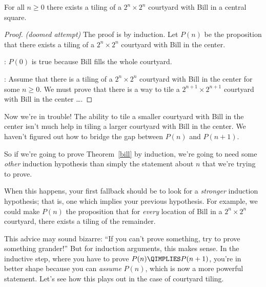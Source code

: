 \begin{theorem}\label{bill}
For all $n \geq 0$ there exists a tiling of a $2^n \times 2^n$
courtyard with Bill in a central square.
\end{theorem}

\begin{proof}
\emph{(doomed attempt)} The proof is by induction.  Let $P(n)$ be the
proposition that there exists a tiling of a $2^n \times 2^n$ courtyard
with Bill in the center.

: $P(0)$ is true because Bill fills the whole courtyard.

: Assume that there is a tiling of a
$2^n \times 2^n$ courtyard with Bill in the center for some $n \geq
0$.  We must prove that there is a way to tile a $2^{n+1} \times
2^{n+1}$ courtyard with Bill in the center \dots.
\end{proof}

Now we're in trouble!  The ability to tile a smaller courtyard with Bill
in the center isn't much help in tiling a larger courtyard with Bill in
the center.  We haven't figured out how to bridge the gap between $P(n)$
and $P(n+1)$.

So if we're going to prove Theorem~\ref{bill} by induction, we're going to
need some \emph{other} induction hypothesis than simply the statement
about $n$ that we're trying to prove.


\iffalse
\textbf{Maybe you can figure out a good induction hypothesis for
  tiling.  In class we'll present some hypotheses that do work.}
\fi


When this happens, your first fallback should be to look for a
\emph{stronger} induction hypothesis; that is, one which implies
your previous hypothesis.  For example, we could make $P(n)$ the
proposition that for \emph{every} location of Bill in a $2^n \times
2^n$ courtyard, there exists a tiling of the remainder.

This advice may sound bizarre: ``If you can't prove something, try to
prove something grander!''  But for induction arguments, this makes
sense.  In the inductive step, where you have to prove $P(n) \QIMPLIES
P(n+1)$, you're in better shape because you can \emph{assume} $P(n)$,
which is now a more powerful statement.  Let's see how this plays out
in the case of courtyard tiling.

